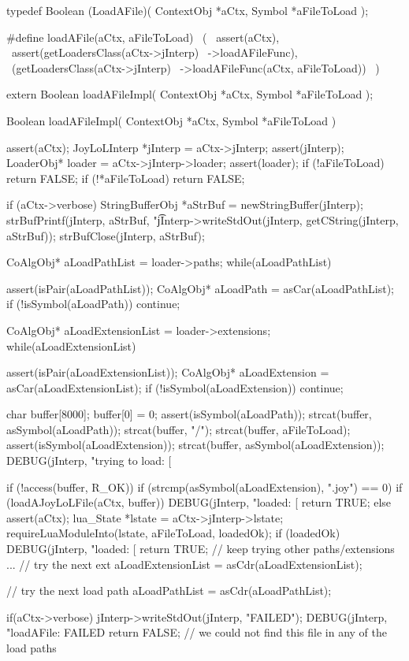 \startCHeader
typedef Boolean (LoadAFile)(
  ContextObj *aCtx,
  Symbol     *aFileToLoad
);

#define loadAFile(aCtx, aFileToLoad)       \
  (                                        \
    assert(aCtx),                          \
    assert(getLoadersClass(aCtx->jInterp)  \
      ->loadAFileFunc),                    \
    (getLoadersClass(aCtx->jInterp)        \
      ->loadAFileFunc(aCtx, aFileToLoad))  \
  )
\stopCHeader

\setCHeaderStream{private}
\startCHeader
extern Boolean loadAFileImpl(
  ContextObj *aCtx,
  Symbol     *aFileToLoad
);
\stopCHeader
\setCHeaderStream{public}

\startCCode
Boolean loadAFileImpl(
  ContextObj *aCtx,
  Symbol     *aFileToLoad
) {
  assert(aCtx);
  JoyLoLInterp *jInterp = aCtx->jInterp;
  assert(jInterp);
  LoaderObj* loader = aCtx->jInterp->loader;
  assert(loader);
  if (!aFileToLoad) return FALSE;
  if (!*aFileToLoad) return FALSE;

  if (aCtx->verbose) {
    StringBufferObj *aStrBuf = 
      newStringBuffer(jInterp);
    strBufPrintf(jInterp, aStrBuf, "\t%
    jInterp->writeStdOut(jInterp, getCString(jInterp, aStrBuf));
    strBufClose(jInterp, aStrBuf);
  }

  CoAlgObj* aLoadPathList = loader->paths;
  while(aLoadPathList) {
    assert(isPair(aLoadPathList));
    CoAlgObj* aLoadPath = asCar(aLoadPathList);
    if (!isSymbol(aLoadPath)) continue;

    CoAlgObj* aLoadExtensionList = loader->extensions;
    while(aLoadExtensionList) {
      assert(isPair(aLoadExtensionList));
      CoAlgObj* aLoadExtension = asCar(aLoadExtensionList);
      if (!isSymbol(aLoadExtension)) continue;

      char buffer[8000];
      buffer[0] = 0;
      assert(isSymbol(aLoadPath));
      strcat(buffer, asSymbol(aLoadPath));
      strcat(buffer, "/");
      strcat(buffer, aFileToLoad);
      assert(isSymbol(aLoadExtension));
      strcat(buffer, asSymbol(aLoadExtension));
      DEBUG(jInterp, "trying to load: [%

      if (!access(buffer, R_OK)) {
        if (strcmp(asSymbol(aLoadExtension), ".joy") == 0) {
          if (loadAJoyLoLFile(aCtx, buffer)) {
            DEBUG(jInterp, "loaded: [%
            return TRUE;
          }
        } else {
          assert(aCtx);
          lua_State *lstate = aCtx->jInterp->lstate;
          requireLuaModuleInto(lstate, aFileToLoad, loadedOk);
          if (loadedOk) {
            DEBUG(jInterp, "loaded: [%
            return TRUE;
          }
        }
        // keep trying other paths/extensions ...
      }
      // try the next ext
      aLoadExtensionList = asCdr(aLoadExtensionList);
    }
    // try the next load path
    aLoadPathList = asCdr(aLoadPathList);
  }
  if(aCtx->verbose) {
    jInterp->writeStdOut(jInterp, "FAILED\n");
  }
  DEBUG(jInterp, "loadAFile: FAILED%
  return FALSE; // we could not find this file in any of the load paths
}
\stopCCode

